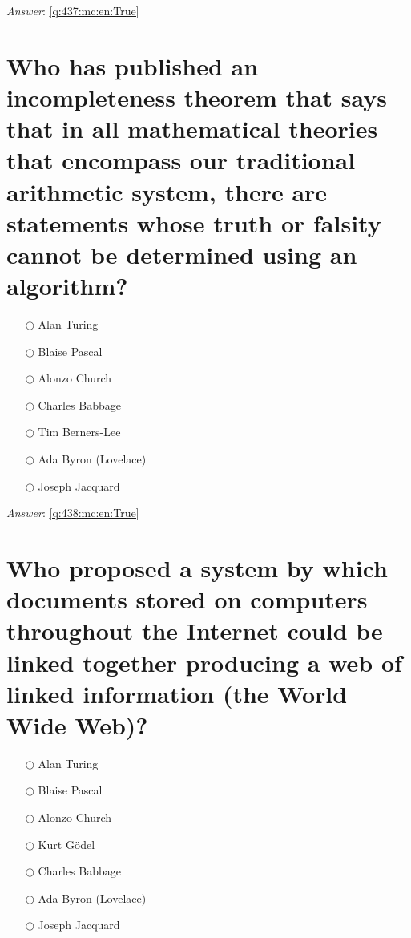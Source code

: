 \documentclass[a4paper,11pt,oneside]{book}
\begin{document}
\begin{sloppypar}
\textit{Answer}: \autoref{q:437:mc:en:True}



\section{Who has published an incompleteness theorem that says that in all mathematical theories that encompass our traditional arithmetic system, there are statements whose truth or falsity cannot be determined using an algorithm?}

\label{q:438:mc:en:False}

\begin{itemize}
  \item[$\bigcirc$] Alan Turing
  \item[$\bigcirc$] Blaise Pascal
  \item[$\bigcirc$] Alonzo Church
  \item[$\bigcirc$] Charles Babbage
  \item[$\bigcirc$] Tim Berners-Lee
  \item[$\bigcirc$] Ada Byron (Lovelace)
  \item[$\bigcirc$] Joseph Jacquard
\end{itemize}

\vspace{1cm}

\textit{Answer}: \autoref{q:438:mc:en:True}



\section{Who proposed a system by which documents stored on computers throughout the Internet could be linked together producing a web of linked information (the World Wide Web)?}

\label{q:439:mc:en:False}

\begin{itemize}
  \item[$\bigcirc$] Alan Turing
  \item[$\bigcirc$] Blaise Pascal
  \item[$\bigcirc$] Alonzo Church
  \item[$\bigcirc$] Kurt G\"odel
  \item[$\bigcirc$] Charles Babbage
  \item[$\bigcirc$] Ada Byron (Lovelace)
  \item[$\bigcirc$] Joseph Jacquard
\end{itemize}


\end{sloppypar}
\end{document}
